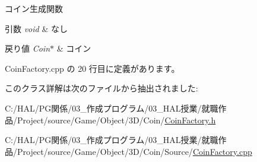 コイン生成関数 


\begin{DoxyParams}{引数}
{\em void} & なし \\
\hline
\end{DoxyParams}

\begin{DoxyRetVals}{戻り値}
{\em Coin$\ast$} & コイン \\
\hline
\end{DoxyRetVals}


 Coin\+Factory.\+cpp の 20 行目に定義があります。



このクラス詳解は次のファイルから抽出されました\+:\begin{DoxyCompactItemize}
\item 
C\+:/\+H\+A\+L/\+P\+G関係/03\+\_\+作成プログラム/03\+\_\+\+H\+A\+L授業/就職作品/\+Project/source/\+Game/\+Object/3\+D/\+Coin/\mbox{\hyperlink{_coin_factory_8h}{Coin\+Factory.\+h}}\item 
C\+:/\+H\+A\+L/\+P\+G関係/03\+\_\+作成プログラム/03\+\_\+\+H\+A\+L授業/就職作品/\+Project/source/\+Game/\+Object/3\+D/\+Coin/\+Source/\mbox{\hyperlink{_coin_factory_8cpp}{Coin\+Factory.\+cpp}}\end{DoxyCompactItemize}
